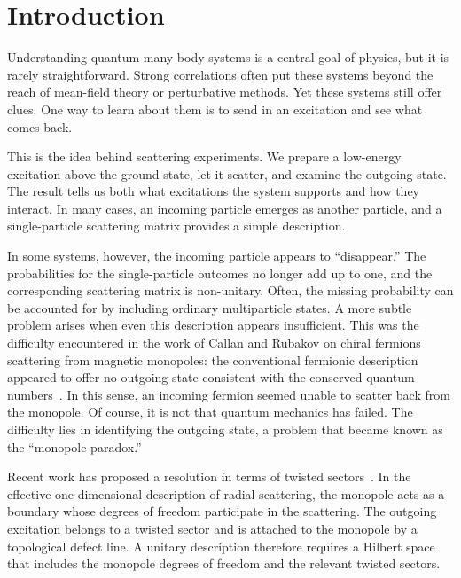 \documentclass[aps,floatfix,10pt,amssymb,amsfont,amsmath,superscriptaddress,float,nofootinbib,longbibliography,nobalancelastpage,twocolumn]{revtex4-2}
\begin{document}
\section{Introduction}
Understanding quantum many-body systems is a central goal of physics, but it is rarely straightforward. Strong correlations often put these systems beyond the reach of mean-field theory or perturbative methods. Yet these systems still offer clues. One way to learn about them is to send in an excitation and see what comes back.

This is the idea behind scattering experiments. We prepare a low-energy excitation above the ground state, let it scatter, and examine the outgoing state. The result tells us both what excitations the system supports and how they interact. In many cases, an incoming particle emerges as another particle, and a single-particle scattering matrix provides a simple description.

In some systems, however, the incoming particle appears to “disappear.” The probabilities for the single-particle outcomes no longer add up to one, and the corresponding scattering matrix is non-unitary. Often, the missing probability can be accounted for by including ordinary multiparticle states. A more subtle problem arises when even this description appears insufficient. This was the difficulty encountered in the work of Callan and Rubakov on chiral fermions scattering from magnetic monopoles: the conventional fermionic description appeared to offer no outgoing state consistent with the conserved quantum numbers~\cite{Callan:1982ah,Rubakov:1982fp,Polchinski:fermion_rotor}. In this sense, an incoming fermion seemed unable to scatter back from the monopole. Of course, it is not that quantum mechanics has failed. The difficulty lies in identifying the outgoing state, a problem that became known as the “monopole paradox.”

Recent work has proposed a resolution in terms of twisted sectors~\cite{van_beest_fermion-monopole_2024,van_beest_monopoles_2025,loladze_monopole-fermion_2025,loladze_dynamics_2025}. In the effective one-dimensional description of radial scattering, the monopole acts as a boundary whose degrees of freedom participate in the scattering. The outgoing excitation belongs to a twisted sector and is attached to the monopole by a topological defect line. A unitary description therefore requires a Hilbert space that includes the monopole degrees of freedom and the relevant twisted sectors.
\end{document}
